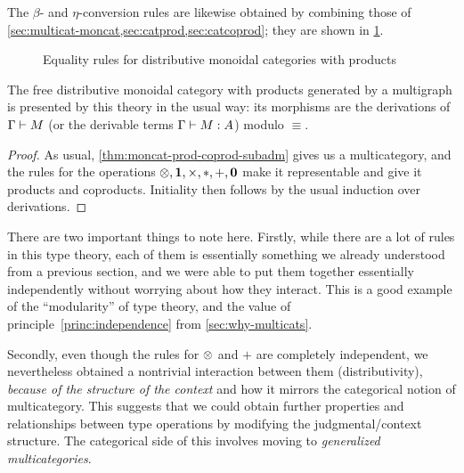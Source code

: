 The $\beta$- and $\eta$-conversion rules are likewise obtained by combining those of \cref{sec:multicat-moncat,sec:catprod,sec:catcoprod}; they are shown in \cref{fig:moncat-prod-coprod-equiv}.

\begin{figure}
  \centering
  \caption{Equality rules for distributive monoidal categories with products}
  \label{fig:moncat-prod-coprod-equiv}
\end{figure}

\begin{thm}\label{thm:moncat-prod-coprod-initial}
  The free distributive monoidal category with products generated by a multigraph \cG is presented by this theory in the usual way: its morphisms are the derivations of $\Gamma\vdash M$ (or the derivable terms $\Gamma\vdash M:A$) modulo $\equiv$.
\end{thm}
\begin{proof}
  As usual, \cref{thm:moncat-prod-coprod-subadm} gives us a multicategory, and the rules for the operations $\tensor,\one,\times,\ttt,+,\zero$ make it representable and give it products and coproducts.
  Initiality then follows by the usual induction over derivations.
\end{proof}

There are two important things to note here.
Firstly, while there are a lot of rules in this type theory, each of them is essentially something we already understood from a previous section, and we were able to put them together essentially independently without worrying about how they interact.
This is a good example of the ``modularity'' of type theory, and the value of principle~\eqref{princ:independence} from \cref{sec:why-multicats}.

Secondly, even though the rules for $\otimes$ and $+$ are completely independent, we nevertheless obtained a nontrivial interaction between them (distributivity), \emph{because of the structure of the context} and how it mirrors the categorical notion of multicategory.
This suggests that we could obtain further properties and relationships between type operations by modifying the judgmental/context structure.
The categorical side of this involves moving to \emph{generalized multicategories}.

